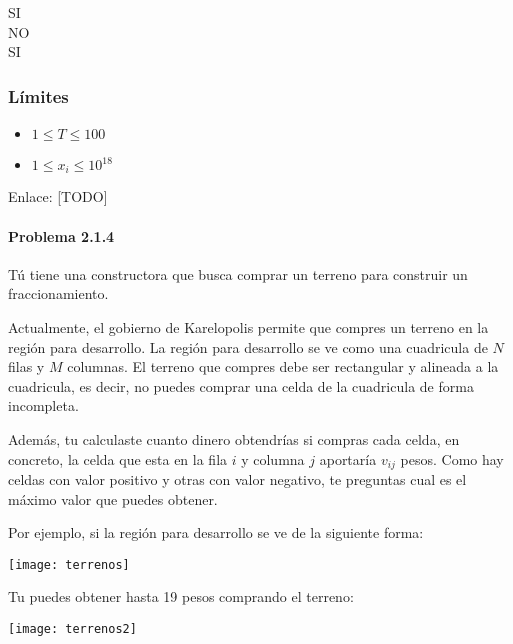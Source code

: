 \begin{casebox2}
	{
		SI\\
		NO\\
		SI
	}
\end{casebox2}

\subsubsection*{Límites}

\begin{itemize}
	\setlength{\parskip}{1pt}	
	\item \(1\leq T \leq 100\)
	\item \(1\leq x_i \leq 10^{18}\)
\end{itemize}

Enlace: [TODO]

\problembreak

\paragraph{Problema 2.1.4} Tú tiene una constructora que busca comprar un terreno para construir un fraccionamiento.

Actualmente, el gobierno de Karelopolis permite que compres un terreno en la región para desarrollo. La región para desarrollo se ve como una cuadricula de \(N\) filas y \(M\) columnas. El terreno que compres debe ser rectangular y alineada a la cuadricula, es decir, no puedes comprar una celda de la cuadricula de forma incompleta.

Además, tu calculaste cuanto dinero obtendrías si compras cada celda, en concreto, la celda que esta en la fila \(i\) y columna \(j\) aportaría \(v_{ij}\) pesos. Como hay celdas con valor positivo y otras con valor negativo, te preguntas cual es el máximo valor que puedes obtener.

Por ejemplo, si la región para desarrollo se ve de la siguiente forma:

\begin{center}
		\texttt{[image: terrenos]}
\end{center}

Tu puedes obtener hasta 19 pesos comprando el terreno:

\begin{center}
	\texttt{[image: terrenos2]}
\end{center}


